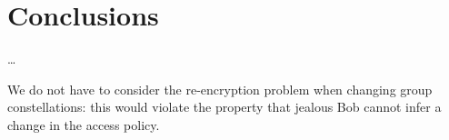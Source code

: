 %


\section{Conclusions}\label{Conclusions}

\dots

We do not have to consider the re-encryption problem when changing group 
constellations: this would violate the property that jealous Bob cannot infer 
a change in the access policy.

